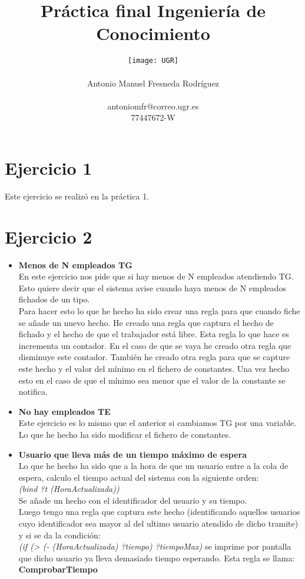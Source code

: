 \documentclass[10pt,spanish]{article}
\author{
	\texttt{[image: UGR]} \\\\
	\Large 	Antonio Manuel Fresneda Rodríguez\\
	\\antoniomfr@correo.ugr.es
	\\77447672-W
}
\date{}
\title{\huge \textbf{Práctica final Ingeniería de Conocimiento}}
\begin{document}
	\maketitle
	\pagebreak
	\tableofcontents
	\pagebreak
	\section{Ejercicio 1}
	Este ejercicio se realizó en la práctica 1.
	\section{Ejercicio 2}
	\begin{itemize}
		\item \textbf{Menos de N empleados TG}\\
		En este ejercicio nos pide que si hay menos de N empleados atendiendo TG. Esto quiere decir que el sistema avise cuando haya menos de N empleados fichados de un tipo. \\
		Para hacer esto lo que he hecho ha sido crear una regla para que cuando fiche se añade un nuevo hecho. He creado una regla que captura el hecho de fichado y el hecho de que el
		trabajador está libre. Esta regla lo que hace es incrementa un contador. En el caso de que se vaya he creado otra regla que disminuye este contador. También he creado otra regla para que se capture este hecho y el valor del mínimo en el fichero de constantes. Una vez hecho esto en el caso de que el mínimo sea menor que el valor de la constante
		se notifica.
		\item \textbf{No hay empleados TE}\\
		Este ejercicio es lo mismo que el anterior si cambiamos TG por una variable. Lo que he hecho ha sido modificar el fichero de constantes.
		\item \textbf{Usuario que lleva más de un tiempo máximo de espera}\\
		Lo que he hecho ha sido que a la hora de que un usuario entre a la cola de espera, calculo el tiempo actual del sistema con la siguiente orden:\\ \textit{(bind ?t (HoraActualizada))
		}\\
		Se añade un hecho con el identificador del usuario y su tiempo. \\
		Luego tengo una regla que captura este hecho  (identificando aquellos usuarios cuyo identificador sea mayor al del ultimo usuario atendido de dicho tramite) y si se da la condición:\\ \textit{(if (> (- (HoraActualizada) ?tiempo) ?tiempoMax)} se imprime por pantalla que dicho usuario ya lleva demasiado tiempo esperando. Esta regla se llama: \textbf{ComprobarTiempo}

\end{itemize}
\end{document}

